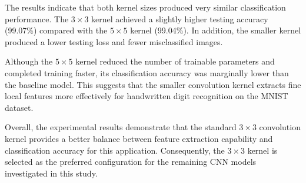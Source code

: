 The results indicate that both kernel sizes produced very similar classification performance. The $3\times3$ kernel achieved a slightly higher testing accuracy (99.07\%) compared with the $5\times5$ kernel (99.04\%). In addition, the smaller kernel produced a lower testing loss and fewer misclassified images.

Although the $5\times5$ kernel reduced the number of trainable parameters and completed training faster, its classification accuracy was marginally lower than the baseline model. This suggests that the smaller convolution kernel extracts fine local features more effectively for handwritten digit recognition on the MNIST dataset.

Overall, the experimental results demonstrate that the standard $3\times3$ convolution kernel provides a better balance between feature extraction capability and classification accuracy for this application. Consequently, the $3\times3$ kernel is selected as the preferred configuration for the remaining CNN models investigated in this study.